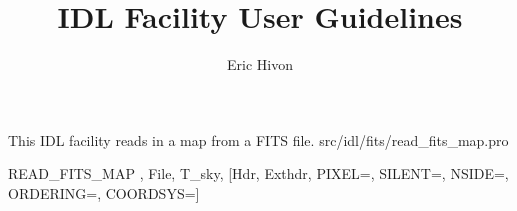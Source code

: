 




\renewcommand{\facname}{{read\_fits\_map }}
\renewcommand{\FACNAME}{{READ\_FITS\_MAP }}
\sloppy



\title{\healpix IDL Facility User Guidelines}
 \section[read\_fits\_map]{ }
\label{idl:read_fits_map}
\author{Eric Hivon}




\begin{facility}
{This IDL facility reads in a \healpix map from a FITS file.}
{src/idl/fits/read\_fits\_map.pro}
\end{facility}

\begin{IDLformat}
{\FACNAME, File, T\_sky, [Hdr, Exthdr, PIXEL=, SILENT=, NSIDE=, ORDERING=, COORDSYS=]
}
\end{IDLformat}


